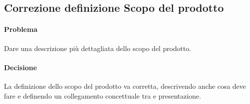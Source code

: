 \subsection{Correzione definizione Scopo del prodotto}
\paragraph{Problema} Dare una descrizione più dettagliata dello scopo del prodotto.
\paragraph{Decisione} La definizione dello scopo del prodotto va corretta, descrivendo anche cosa deve fare e definendo un collegamento concettuale tra  e presentazione.
